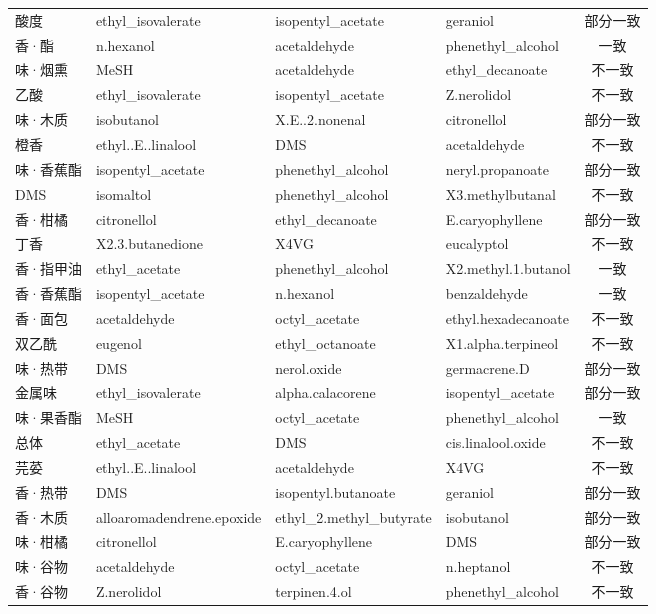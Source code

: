 \documentclass[zihao=-4,a4paper,UTF8,fontset=none]{ctexart}
\begin{document}
\begin{longtable}{@{}p{1.55cm}p{3.35cm}p{3.35cm}p{3.35cm}c@{}}
酸度 & ethyl\_isovalerate & isopentyl\_acetate & geraniol & 部分一致 \\
香·酯 & n.hexanol & acetaldehyde & phenethyl\_alcohol & 一致 \\
味·烟熏 & MeSH & acetaldehyde & ethyl\_decanoate & 不一致 \\
乙酸 & ethyl\_isovalerate & isopentyl\_acetate & Z.nerolidol & 不一致 \\
味·木质 & isobutanol & X.E..2.nonenal & citronellol & 部分一致 \\
橙香 & ethyl..E..linalool & DMS & acetaldehyde & 不一致 \\
味·香蕉酯 & isopentyl\_acetate & phenethyl\_alcohol & neryl.propanoate & 部分一致 \\
DMS & isomaltol & phenethyl\_alcohol & X3.methylbutanal & 不一致 \\
香·柑橘 & citronellol & ethyl\_decanoate & E.caryophyllene & 部分一致 \\
丁香 & X2.3.butanedione & X4VG & eucalyptol & 不一致 \\
香·指甲油 & ethyl\_acetate & phenethyl\_alcohol & X2.methyl.1.butanol & 一致 \\
香·香蕉酯 & isopentyl\_acetate & n.hexanol & benzaldehyde & 一致 \\
香·面包 & acetaldehyde & octyl\_acetate & ethyl.hexadecanoate & 不一致 \\
双乙酰 & eugenol & ethyl\_octanoate & X1.alpha.terpineol & 不一致 \\
味·热带 & DMS & nerol.oxide & germacrene.D & 部分一致 \\
金属味 & ethyl\_isovalerate & alpha.calacorene & isopentyl\_acetate & 部分一致 \\
味·果香酯 & MeSH & octyl\_acetate & phenethyl\_alcohol & 一致 \\
总体 & ethyl\_acetate & DMS & cis.linalool.oxide & 不一致 \\
芫荽 & ethyl..E..linalool & acetaldehyde & X4VG & 不一致 \\
香·热带 & DMS & isopentyl.butanoate & geraniol & 部分一致 \\
香·木质 & alloaromadendrene.epoxide & ethyl\_2.methyl\_butyrate & isobutanol & 部分一致 \\
味·柑橘 & citronellol & E.caryophyllene & DMS & 部分一致 \\
味·谷物 & acetaldehyde & octyl\_acetate & n.heptanol & 不一致 \\
香·谷物 & Z.nerolidol & terpinen.4.ol & phenethyl\_alcohol & 不一致 \\

\end{longtable}
\end{document}
